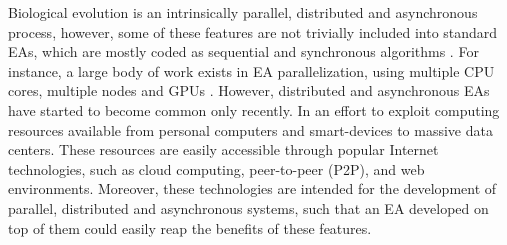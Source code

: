 \documentclass{llncs}
\begin{document}
Biological evolution is an intrinsically parallel, distributed and asynchronous process, however, 
some of these features are not trivially included into standard EAs,  which are mostly coded as sequential 
and synchronous algorithms \cite{eiben}. For instance, a large body of work exists in EA parallelization, 
using multiple CPU cores, multiple nodes and GPUs \cite{}.
However, distributed and asynchronous EAs have started to become common only recently. In an effort to
exploit computing resources available from personal computers and smart-devices to massive data centers.
These resources are easily accessible through popular Internet technologies, such as cloud computing, 
peer-to-peer (P2P), and web environments. Moreover, these technologies are intended for the development 
of parallel, distributed and asynchronous systems, such that an EA developed on top of them could easily 
reap the benefits of these features.
\end{document}
